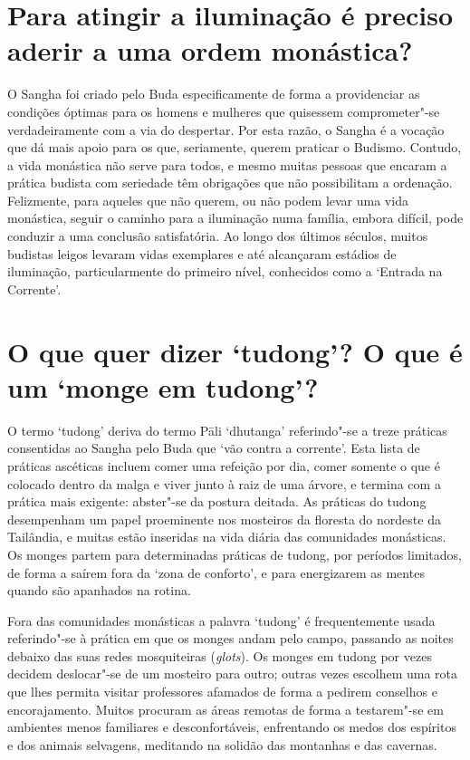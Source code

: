 \section{Para atingir a iluminação é preciso aderir a uma ordem monástica?}

O Sangha foi criado pelo Buda especificamente de forma a providenciar as
condições óptimas para os homens e mulheres que quisessem comprometer"-se
verdadeiramente com a via do despertar. Por esta razão, o Sangha é a
vocação que dá mais apoio para os que, seriamente, querem praticar o
Budismo. Contudo, a vida monástica não serve para todos, e mesmo muitas
pessoas que encaram a prática budista com seriedade têm obrigações que
não possibilitam a ordenação. Felizmente, para aqueles que não querem,
ou não podem levar uma vida monástica, seguir o caminho para a
iluminação numa família, embora difícil, pode conduzir a uma conclusão
satisfatória. Ao longo dos últimos séculos, muitos budistas leigos
levaram vidas exemplares e até alcançaram estádios de iluminação,
particularmente do primeiro nível, conhecidos como a `Entrada na
Corrente'.

\section{O que quer dizer `tudong'? O que é um `monge em tudong'?}

O termo `tudong' deriva do termo Pāli `dhutanga' referindo"-se a
treze práticas consentidas ao Sangha pelo Buda que `vão contra a
corrente'. Esta lista de práticas ascéticas incluem comer uma refeição
por dia, comer somente o que é colocado dentro da malga e viver junto à
raiz de uma árvore, e termina com a prática mais exigente: abster"-se da
postura deitada. As práticas do tudong desempenham um papel proeminente
nos mosteiros da floresta do nordeste da Tailândia, e muitas estão
inseridas na vida diária das comunidades monásticas. Os monges partem
para determinadas práticas de tudong, por períodos limitados, de forma a
saírem fora da `zona de conforto', e para energizarem as mentes quando
são apanhados na rotina.

Fora das comunidades monásticas a palavra `tudong' é frequentemente
usada referindo"-se à prática em que os monges andam pelo campo, passando
as noites debaixo das suas redes mosquiteiras (\emph{glots}). Os monges
em tudong por vezes decidem deslocar"-se de um mosteiro para outro;
outras vezes escolhem uma rota que lhes permita visitar professores
afamados de forma a pedirem conselhos e encorajamento. Muitos procuram
as áreas remotas de forma a testarem"-se em ambientes menos familiares e
desconfortáveis, enfrentando os medos dos espíritos e dos animais
selvagens, meditando na solidão das montanhas e das cavernas.


